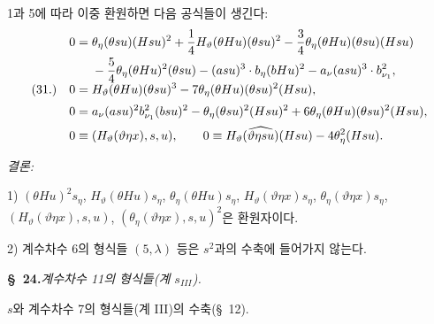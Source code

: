 1과 5에 따라 이중 환원하면 다음 공식들이 생긴다:
\[
\begin{array}{@{}r@{\quad}l@{}}
&\displaystyle
\begin{aligned}
0={}&\theta_\eta(\theta su)(Hsu)^2+\frac14H_\vartheta(\theta Hu)(\theta su)^2-\frac34\theta_\eta(\theta Hu)(\theta su)(Hsu)\\
&-\frac54\theta_\eta(\theta Hu)^2(\theta su)-(asu)^3\cdot b_\eta(bHu)^2-a_\nu(asu)^3\cdot b_{\nu_1}^2,
\end{aligned}\\[0.55em]
(31.)&\displaystyle 0=H_\vartheta(\theta Hu)(\theta su)^3-7\theta_\eta(\theta Hu)(\theta su)^2(Hsu),\\[0.55em]
&\displaystyle 0=a_\nu(asu)^2b_{\nu_1}^{2}(bsu)^2-\theta_\eta(\theta su)^2(Hsu)^2+6\theta_\eta(\theta Hu)(\theta su)^2(Hsu),\\[0.55em]
&\displaystyle 0\equiv (H_\vartheta(\vartheta\eta x),s,u),\qquad
0\equiv H_\vartheta(\widehat{\vartheta\eta su})(Hsu)-4\theta_\eta^2(Hsu).
\end{array}
\]

\noindent\emph{결론:}

1) $(\theta Hu)^2s_\eta$, $H_\vartheta(\theta Hu)s_\eta$, $\theta_\eta(\theta Hu)s_\eta$, $H_\vartheta(\vartheta\eta x)s_\eta$, $\theta_\eta(\vartheta\eta x)s_\eta$, $(H_\vartheta(\vartheta\eta x),s,u)$, $(\theta_\eta(\vartheta\eta x),s,u)^2$은 환원자이다.

2) 계수차수 6의 형식들 $(5,\lambda)$ 등은 $s^2$과의 수축에 들어가지 않는다.

\begin{center}\textbf{\S\ 24.}\quad\emph{계수차수 11의 형식들(계 $s_{III}$).}\end{center}
$s$와 계수차수 7의 형식들(계 III)의 수축(\S\ 12).

